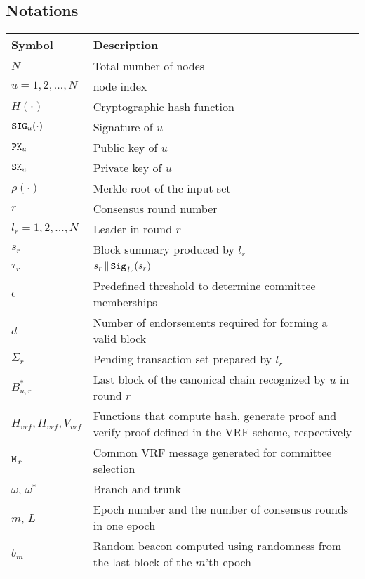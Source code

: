 \documentclass{article}
\begin{document}
\subsection{Notations}
\renewcommand{\arraystretch}{2}
\begin{longtable}{p{3cm} p{10cm}}
    Symbol  & Description \\
    \hline\hline
    $N$ & Total number of nodes \\
    \hline
    $u=1,2,\dots,N$ & node index \\
    \hline
    $H(\cdot)$ & Cryptographic hash function \\
    \hline
    ${\tt SIG}_u(\cdot)$ & Signature of $u$ \\
    \hline
    ${\tt PK}_u$ & Public key of $u$ \\
    \hline
    ${\tt SK}_u$ & Private key of $u$ \\
    \hline
    $\rho\left(\cdot\right)$ & Merkle root of the input set\\
    \hline
    $r$ & Consensus round number \\
    \hline
    $l_r=1,2,...,N$ & Leader in round $r$ \\
    \hline
    $s_r$ & Block summary produced by $l_r$ \\
    \hline
    $\tau_r$ & $s_r\,\|\,{\tt Sig}_{\,l_r}(s_r)$ \\
    \hline
    $\epsilon$ & Predefined threshold to determine committee memberships \\
    \hline
    $d$ & Number of endorsements required for forming a valid block \\
    \hline
    $\Sigma_r$ & Pending transaction set prepared by $l_r$ \\
    \hline
    $B_{u,r}^*$ & Last block of the canonical chain recognized by $u$ in round $r$\\ 
    \hline
    $H_{vrf},\Pi_{vrf},V_{vrf}$ & Functions that compute hash, generate proof and verify proof defined in the VRF scheme, respectively \\
    \hline
    ${\tt M}_{\,r}$ & Common VRF message generated for committee selection \\
    \hline
    $\omega$, $\omega^*$ & Branch and trunk \\
    \hline
    $m$, $L$ & Epoch number and the number of consensus rounds in one epoch \\
    \hline
    $b_m$ & Random beacon computed using randomness from the last block of the $m$'th epoch \\
    \hline
\end{longtable}
\end{document}
